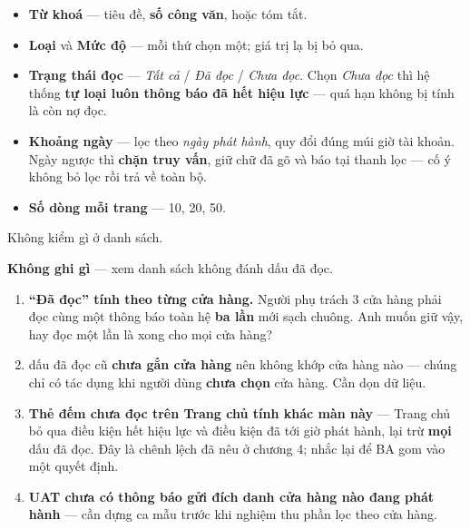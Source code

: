 \mloc

\begin{itemize}[leftmargin=*]
  \item \textbf{Từ khoá} --- tiêu đề, \textbf{số công văn}, hoặc tóm tắt.
  \item \textbf{Loại} và \textbf{Mức độ} --- mỗi thứ chọn một; giá trị lạ bị bỏ qua.
  \item \textbf{Trạng thái đọc} --- \emph{Tất cả} / \emph{Đã đọc} / \emph{Chưa đọc}. Chọn
        \emph{Chưa đọc} thì hệ thống \textbf{tự loại luôn thông báo đã hết hiệu lực} --- quá hạn
        không bị tính là còn nợ đọc.
  \item \textbf{Khoảng ngày} --- lọc theo \emph{ngày phát hành}, quy đổi đúng múi giờ tài khoản.
        Ngày ngược thì \textbf{chặn truy vấn}, giữ chữ đã gõ và báo tại thanh lọc --- cố ý không
        bỏ lọc rồi trả về toàn bộ.
  \item \textbf{Số dòng mỗi trang} --- 10, 20, 50.
\end{itemize}


Không kiểm gì ở danh sách.

\mghi

\textbf{Không ghi gì} --- xem danh sách không đánh dấu đã đọc.

\mhoi

\begin{ask}
\begin{enumerate}[leftmargin=*]
  \item \textbf{``Đã đọc'' tính theo từng cửa hàng.} Người phụ trách 3 cửa hàng phải đọc cùng
        một thông báo toàn hệ \textbf{ba lần} mới sạch chuông. Anh muốn giữ vậy, hay đọc một
        lần là xong cho mọi cửa hàng?
  \item {} dấu đã đọc cũ \textbf{chưa gắn cửa hàng} nên không khớp cửa hàng nào --- chúng
        chỉ có tác dụng khi người dùng \textbf{chưa chọn} cửa hàng. Cần dọn dữ liệu.
  \item \textbf{Thẻ đếm chưa đọc trên Trang chủ tính khác màn này} --- Trang chủ bỏ qua điều
        kiện hết hiệu lực và điều kiện đã tới giờ phát hành, lại trừ \textbf{mọi} dấu đã đọc.
        Đây là chênh lệch đã nêu ở chương 4; nhắc lại để BA gom vào một quyết định.
  \item \textbf{UAT chưa có thông báo gửi đích danh cửa hàng nào đang phát hành} --- cần dựng ca
        mẫu trước khi nghiệm thu phần lọc theo cửa hàng.
\end{enumerate}
\end{ask}

